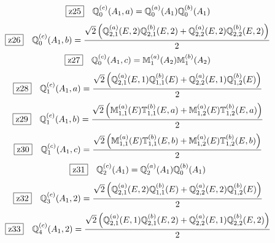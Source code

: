 \documentclass[fleqn,10pt,landscape]{jsarticle}
\begin{document}
\begin{dmath*}
\hspace*{3mm}\fbox{z25}\quad \mathbb{Q}_{0}^{(c)}(A_{1},a)=\mathbb{Q}_{0}^{(a)}(A_{1}) \mathbb{Q}_{0}^{(b)}(A_{1})
\end{dmath*}
\begin{dmath*}
\hspace*{3mm}\fbox{z26}\quad \mathbb{Q}_{0}^{(c)}(A_{1},b)=\frac{\sqrt{2} \left(\mathbb{Q}_{2,1}^{(a)}(E,2) \mathbb{Q}_{2,1}^{(b)}(E,2) + \mathbb{Q}_{2,2}^{(a)}(E,2) \mathbb{Q}_{2,2}^{(b)}(E,2)\right)}{2}
\end{dmath*}
\begin{dmath*}
\hspace*{3mm}\fbox{z27}\quad \mathbb{Q}_{0}^{(c)}(A_{1},c)=\mathbb{M}_{1}^{(a)}(A_{2}) \mathbb{M}_{1}^{(b)}(A_{2})
\end{dmath*}
\begin{dmath*}
\hspace*{3mm}\fbox{z28}\quad \mathbb{Q}_{1}^{(c)}(A_{1},a)=\frac{\sqrt{2} \left(\mathbb{Q}_{2,1}^{(a)}(E,1) \mathbb{Q}_{1,1}^{(b)}(E) + \mathbb{Q}_{2,2}^{(a)}(E,1) \mathbb{Q}_{1,2}^{(b)}(E)\right)}{2}
\end{dmath*}
\begin{dmath*}
\hspace*{3mm}\fbox{z29}\quad \mathbb{Q}_{1}^{(c)}(A_{1},b)=\frac{\sqrt{2} \left(\mathbb{M}_{1,1}^{(a)}(E) \mathbb{T}_{1,1}^{(b)}(E,a) + \mathbb{M}_{1,2}^{(a)}(E) \mathbb{T}_{1,2}^{(b)}(E,a)\right)}{2}
\end{dmath*}
\begin{dmath*}
\hspace*{3mm}\fbox{z30}\quad \mathbb{Q}_{1}^{(c)}(A_{1},c)=\frac{\sqrt{2} \left(\mathbb{M}_{1,1}^{(a)}(E) \mathbb{T}_{1,1}^{(b)}(E,b) + \mathbb{M}_{1,2}^{(a)}(E) \mathbb{T}_{1,2}^{(b)}(E,b)\right)}{2}
\end{dmath*}
\begin{dmath*}
\hspace*{3mm}\fbox{z31}\quad \mathbb{Q}_{2}^{(c)}(A_{1})=\mathbb{Q}_{2}^{(a)}(A_{1}) \mathbb{Q}_{0}^{(b)}(A_{1})
\end{dmath*}
\begin{dmath*}
\hspace*{3mm}\fbox{z32}\quad \mathbb{Q}_{3}^{(c)}(A_{1},2)=\frac{\sqrt{2} \left(\mathbb{Q}_{2,1}^{(a)}(E,2) \mathbb{Q}_{1,1}^{(b)}(E) + \mathbb{Q}_{2,2}^{(a)}(E,2) \mathbb{Q}_{1,2}^{(b)}(E)\right)}{2}
\end{dmath*}
\begin{dmath*}
\hspace*{3mm}\fbox{z33}\quad \mathbb{Q}_{4}^{(c)}(A_{1},2)=\frac{\sqrt{2} \left(\mathbb{Q}_{2,1}^{(a)}(E,1) \mathbb{Q}_{2,1}^{(b)}(E,2) + \mathbb{Q}_{2,2}^{(a)}(E,1) \mathbb{Q}_{2,2}^{(b)}(E,2)\right)}{2}
\end{dmath*}
\end{document}
